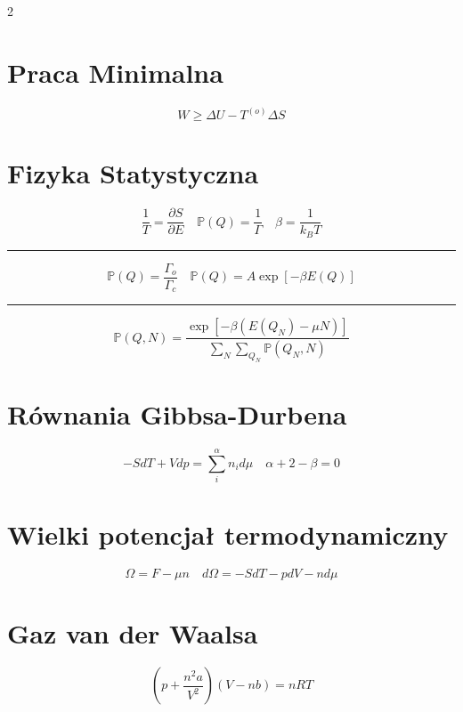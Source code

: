 \documentclass{../konspekt}
\begin{document}
\begin{multicols}{2}
  \section{Praca Minimalna}

  $$
  W \geq \Delta U - T^{(o)} \Delta S
  $$

  \vspace{-2em}

  \section{Fizyka Statystyczna}

  $$
  \frac{1}{T} = \frac{\partial S}{\partial E} \quad \mathbb{P}(Q) =
  \frac{1}{\Gamma} \quad   \beta = \frac{1}{k_BT}
  $$
  \hrule
  $$
  \mathbb{P}(Q) = \frac{\Gamma_o}{\Gamma_c}
  \quad \mathbb{P}(Q) = A \exp\left[-\beta E(Q)\right]
  $$
  \hrule
  $$
  \mathbb{P}(Q, N) = \frac{\exp \left[-\beta(E(Q_N) - \mu
  N)\right]}{\sum_N \sum_{Q_N} \mathbb{P}(Q_N, N)}
  $$

  \section{Równania Gibbsa-Durbena}

  $$
  -SdT + Vdp = \sum_i^\alpha n_i d\mu \quad \alpha + 2 - \beta = 0
  $$

  \section{Wielki potencjał termodynamiczny}

  $$
  \Omega = F - \mu n \quad d\Omega = -SdT - pdV - nd\mu
  $$

  \section{Gaz van der Waalsa}

  $$
  \left(p + \frac{n^2a}{V^2}\right)\left(V - nb\right) = nRT
  $$

\end{multicols}
\end{document}
